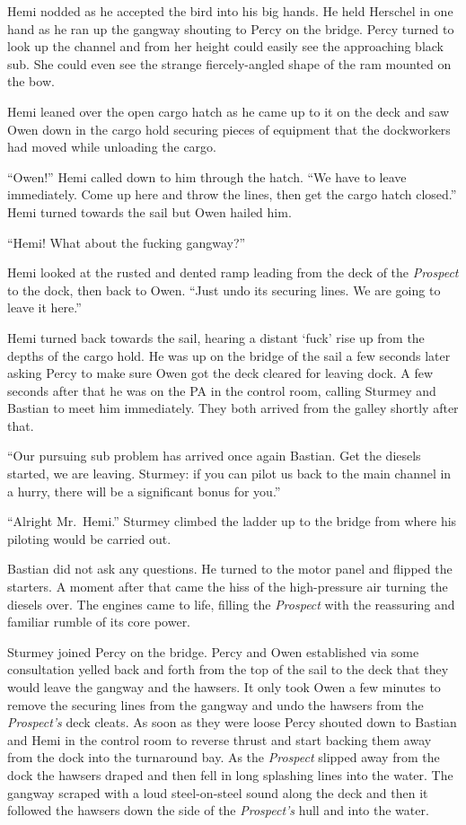 \documentclass[]{scrbook}
\begin{document}
Hemi nodded as he accepted the bird into his big hands. He held Herschel
in one hand as he ran up the gangway shouting to Percy on the bridge.
Percy turned to look up the channel and from her height could easily see
the approaching black sub. She could even see the strange
fiercely-angled shape of the ram mounted on the bow.

Hemi leaned over the open cargo hatch as he came up to it on the deck
and saw Owen down in the cargo hold securing pieces of equipment that
the dockworkers had moved while unloading the cargo.

``Owen!'' Hemi called down to him through the hatch. ``We have to leave
immediately. Come up here and throw the lines, then get the cargo hatch
closed.'' Hemi turned towards the sail but Owen hailed him.

``Hemi! What about the fucking gangway?''

Hemi looked at the rusted and dented ramp leading from the deck of the
\emph{Prospect} to the dock, then back to Owen. ``Just undo its securing
lines. We are going to leave it here.''

Hemi turned back towards the sail, hearing a distant `fuck' rise up from
the depths of the cargo hold. He was up on the bridge of the sail a few
seconds later asking Percy to make sure Owen got the deck cleared for
leaving dock. A few seconds after that he was on the PA in the control
room, calling Sturmey and Bastian to meet him immediately. They both
arrived from the galley shortly after that.

``Our pursuing sub problem has arrived once again Bastian. Get the
diesels started, we are leaving. Sturmey: if you can pilot us back to
the main channel in a hurry, there will be a significant bonus for
you.''

``Alright Mr.~Hemi.'' Sturmey climbed the ladder up to the bridge from
where his piloting would be carried out.

Bastian did not ask any questions. He turned to the motor panel and
flipped the starters. A moment after that came the hiss of the
high-pressure air turning the diesels over. The engines came to life,
filling the \emph{Prospect} with the reassuring and familiar rumble of
its core power.

Sturmey joined Percy on the bridge. Percy and Owen established via some
consultation yelled back and forth from the top of the sail to the deck
that they would leave the gangway and the hawsers. It only took Owen a
few minutes to remove the securing lines from the gangway and undo the
hawsers from the \emph{Prospect's} deck cleats. As soon as they were
loose Percy shouted down to Bastian and Hemi in the control room to
reverse thrust and start backing them away from the dock into the
turnaround bay. As the \emph{Prospect} slipped away from the dock the
hawsers draped and then fell in long splashing lines into the water. The
gangway scraped with a loud steel-on-steel sound along the deck and then
it followed the hawsers down the side of the \emph{Prospect's} hull and
into the water.
\end{document}

